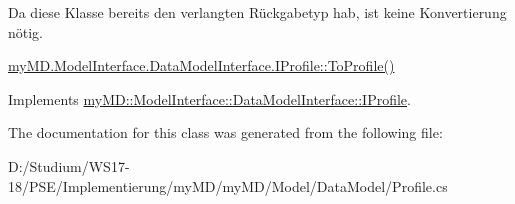 Da diese Klasse bereits den verlangten R\"{u}ckgabetyp hab, ist keine Konvertierung n\"{o}tig. 

\hyperlink{interfacemy_m_d_1_1_model_interface_1_1_data_model_interface_1_1_i_profile_9e2661eb12db275911475edec4a72773}{my\-MD.Model\-Interface.Data\-Model\-Interface.IProfile::To\-Profile()} 

Implements \hyperlink{interfacemy_m_d_1_1_model_interface_1_1_data_model_interface_1_1_i_profile_9e2661eb12db275911475edec4a72773}{my\-MD::Model\-Interface::Data\-Model\-Interface::IProfile}.

The documentation for this class was generated from the following file:\begin{CompactItemize}
\item 
D:/Studium/WS17-18/PSE/Implementierung/my\-MD/my\-MD/Model/Data\-Model/Profile.cs\end{CompactItemize}
